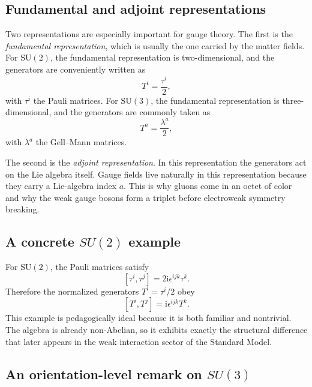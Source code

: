 \documentclass[11pt,a4paper]{article}
\newcommand{\ii}{\mathrm{i}}
\newcommand{\comm}[2]{\left[#1,#2\right]}
\newcommand{\SU}{\mathrm{SU}}
\begin{document}
\subsection{Fundamental and adjoint representations}

Two representations are especially important for gauge theory. The first is the \emph{fundamental representation}, which is usually the one carried by the matter fields. For \(\SU(2)\), the fundamental representation is two-dimensional, and the generators are conveniently written as
\begin{equation}
T^i = \frac{\tau^i}{2},
\label{eq:su2-fund-generators}
\end{equation}
with \(\tau^i\) the Pauli matrices. For \(\SU(3)\), the fundamental representation is three-dimensional, and the generators are commonly taken as
\begin{equation}
T^a=\frac{\lambda^a}{2},
\label{eq:su3-fund-generators}
\end{equation}
with \(\lambda^a\) the Gell--Mann matrices.

The second is the \emph{adjoint representation}. In this representation the generators act on the Lie algebra itself. Gauge fields live naturally in this representation because they carry a Lie-algebra index \(a\). This is why gluons come in an octet of color and why the weak gauge bosons form a triplet before electroweak symmetry breaking.




\subsection{A concrete \texorpdfstring{$SU(2)$}{SU(2)} example}

For \(\SU(2)\), the Pauli matrices satisfy
\[
\comm{\tau^i}{\tau^j}=2\ii\epsilon^{ijk}\tau^k.
\]
Therefore the normalized generators \(T^i=\tau^i/2\) obey
\begin{equation}
\comm{T^i}{T^j}=\ii\epsilon^{ijk}T^k.
\label{eq:su2-algebra-expanded}
\end{equation}
This example is pedagogically ideal because it is both familiar and nontrivial. The algebra is already non-Abelian, so it exhibits exactly the structural difference that later appears in the weak interaction sector of the Standard Model.



\subsection{An orientation-level remark on \texorpdfstring{$SU(3)$}{SU(3)}}
\end{document}
